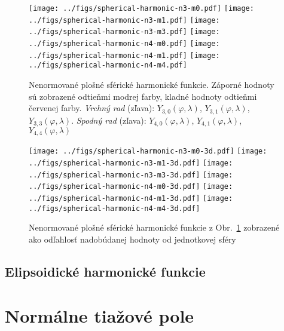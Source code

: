 \documentclass[a4paper, 12pt]{book}
\begin{document}
\begin{figure}[bt]
\centering
\texttt{[image: ../figs/spherical-harmonic-n3-m0.pdf]}
\texttt{[image: ../figs/spherical-harmonic-n3-m1.pdf]}
\texttt{[image: ../figs/spherical-harmonic-n3-m3.pdf]}
\texttt{[image: ../figs/spherical-harmonic-n4-m0.pdf]}
\texttt{[image: ../figs/spherical-harmonic-n4-m1.pdf]}
\texttt{[image: ../figs/spherical-harmonic-n4-m4.pdf]}
\caption{Nenormované plošné sférické harmonické funkcie.  Záporné hodnoty sú 
zobrazené odtieňmi modrej farby, kladné hodnoty odtieňmi červenej farby.  
\textit{Vrchný rad} (zľava): $Y_{3,0}(\varphi, \lambda)$, $Y_{3,1}(\varphi, 
\lambda)$, $Y_{3,3}(\varphi, \lambda)$.  \textit{Spodný rad} (zľava): 
$Y_{4,0}(\varphi, \lambda)$, $Y_{4,1}(\varphi, \lambda)$, $Y_{4,4}(\varphi, 
\lambda)$}
\label{fig:sh}
\end{figure}


\begin{figure}[bt]
\centering
\texttt{[image: ../figs/spherical-harmonic-n3-m0-3d.pdf]}
\texttt{[image: ../figs/spherical-harmonic-n3-m1-3d.pdf]}
\texttt{[image: ../figs/spherical-harmonic-n3-m3-3d.pdf]}
\texttt{[image: ../figs/spherical-harmonic-n4-m0-3d.pdf]}
\texttt{[image: ../figs/spherical-harmonic-n4-m1-3d.pdf]}
\texttt{[image: ../figs/spherical-harmonic-n4-m4-3d.pdf]}
\caption{Nenormované plošné sférické harmonické funkcie z Obr.~\ref{fig:sh} 
zobrazené ako odľahlosť nadobúdanej hodnoty od jednotkovej sféry}
\label{fig:sh3d}
\end{figure}






\section{Elipsoidické harmonické funkcie}








\chapter{Normálne tiažové pole}
\label{sec:normal_gravity_field}

\end{document}
